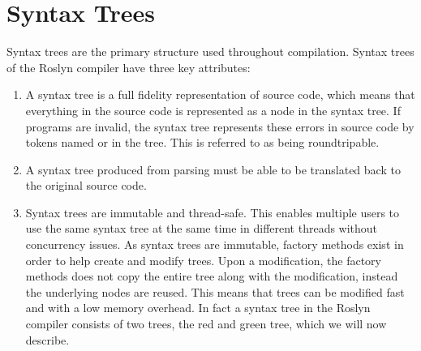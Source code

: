 \section{Syntax Trees}\label{sec:syntax_trees}
Syntax trees are the primary structure used throughout compilation. Syntax trees of the Roslyn compiler have three key attributes\cite[p. 6]{ng2012roslyn}: 
\begin{enumerate}
	\item A syntax tree is a full fidelity representation of source code, which means that everything in the source code is represented as a node in the syntax tree. If programs are invalid, the syntax tree represents these errors in source code by tokens named  or  in the tree.  This is referred to as being roundtripable.
	\item A syntax tree produced from parsing must be able to be translated back to the original source code.
	\item Syntax trees are immutable and thread-safe. This enables multiple users to use the same syntax tree at the same time in different threads without concurrency issues. As syntax trees are immutable, factory methods exist in order to help create and modify trees. Upon a modification, the factory methods does not copy the entire tree along with the modification, instead the underlying nodes are reused. This means that trees can be modified fast and with a low memory overhead. In fact a syntax tree in the Roslyn compiler consists of two trees, the red and green tree, which we will now describe.
\end{enumerate}

